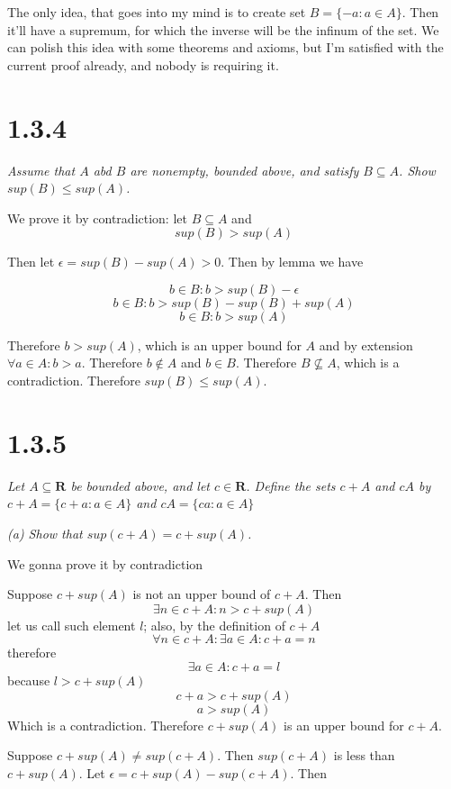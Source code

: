 \documentclass[11pt,oneside,titlepage]{article}
\begin{document}
The only idea, that goes into my mind is to create set $B = \{-a: a \in A\}$.
Then it'll have a supremum, for which the inverse will be the infinum of the
set. We can polish this idea with some theorems and axioms, but I'm satisfied
with the current proof already, and nobody is requiring it.

\section*{1.3.4}
\textit{Assume that $A$ abd $B$ are nonempty, bounded above, and satisfy
  $B \subseteq A$. Show $sup(B) \leq sup(A)$.}

We prove it by contradiction: let $B \subseteq A$ and
$$sup(B) > sup(A)$$

Then let $\epsilon = sup(B) - sup(A) > 0$. Then by lemma we have

$$b \in B: b > sup(B) - \epsilon$$
$$b \in B: b > sup(B) - sup(B) + sup(A)$$
$$b \in B: b > sup(A)$$

Therefore $b > sup(A)$, which is an upper bound for $A$ and by extension
$\forall a \in A: b > a$. Therefore $b \notin A$ and $b \in B$. Therefore
$B \not\subseteq A$, which is a contradiction. Therefore $sup(B) \leq sup(A)$.

\section*{1.3.5}
\textit{Let $A \subseteq \textbf{R}$ be bounded above, and let $c \in
  \textbf{R}$. Define the sets $c + A$ and $cA$ by $c + A = \{c + a: a \in A\}$
  and  $cA = \{ca: a \in A\}$
}

\textit{(a) Show that $sup(c + A) = c + sup(A)$.}


We gonna prove it by contradiction

Suppose $c + sup(A)$ is not an upper bound of $c + A$. Then
$$\exists n \in c + A: n > c + sup(A)$$
let us call such element $l$;
also, by the definition of $c + A$
$$\forall n \in c + A : \exists a \in A: c + a = n$$
therefore
$$\exists a \in A: c + a = l$$
because $l > c + sup(A)$
$$c + a > c + sup(A)$$
$$a > sup(A)$$
Which is a contradiction. Therefore $c + sup(A)$ is an upper bound for $c + A$.

Suppose $c + sup(A) \neq sup(c + A)$. Then $sup(c + A)$ is less
than $c + sup(A)$. Let $\epsilon = c + sup(A) - sup(c + A)$. Then
\end{document}

